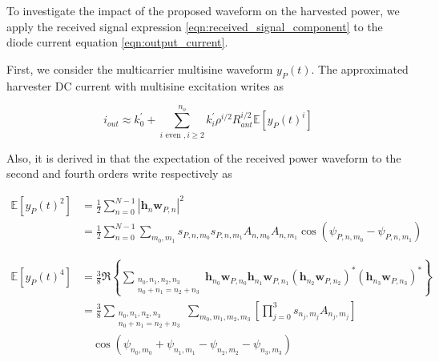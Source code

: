 To investigate the impact of the proposed waveform on the harvested power, we apply the received signal expression \ref{eqn:received_signal_component} to the diode current equation \ref{eqn:output_current}.

First, we consider the multicarrier multisine waveform ${y_P}(t)$. The approximated harvester DC current with multisine excitation writes as

\begin{equation}\label{eqn:current_power}
  {i_{out}} \approx k_0^\prime  + \sum\limits_{i{\text{ even }},i \geqslant 2}^{{n_o}} {k_i^\prime } {\rho ^{i/2}}R_{ant}^{i/2}\mathbb{E}\left[ {{y_P}{{(t)}^i}} \right]
\end{equation}

Also, it is derived in \cite{Clerckx2016} that the expectation of the received power waveform to the second and fourth orders write respectively as

\begin{align}\label{eqn:power_waveform_second_order}
  \mathbb{E}\left[ {{y_P}{{(t)}^2}} \right] &= \frac{1}{2}\sum\limits_{n = 0}^{N - 1} {{{\left| {{{\mathbf{h}}_n}{{\mathbf{w}}_{P,n}}} \right|}^2}}  \\
   &= \frac{1}{2}\sum\limits_{n = 0}^{N - 1} {\sum\limits_{{m_0},{m_1}} {{s_{P,n,{m_0}}}{s_{P,n,{m_1}}}{A_{n,{m_0}}}{A_{n,{m_1}}}\cos \left( {{\psi _{P,n,{m_0}}} - {\psi _{P,n,{m_1}}}} \right)} }
\end{align}

\begin{align}\label{eqn:power_waveform_fourth_order}
  \mathbb{E}\left[ {{y_P}{{(t)}^4}} \right] &= \frac{3}{8}\Re \left\{ {\sum\limits_{\substack{{n_0},{n_1},{n_2},{n_3} \\ {n_0} + {n_1} = {n_2} + {n_3}}} {{{\mathbf{h}}_{{n_0}}}{{\mathbf{w}}_{P,{n_0}}}{{\mathbf{h}}_{{n_1}}}{{\mathbf{w}}_{P,{n_1}}}{{\left( {{{\mathbf{h}}_{{n_2}}}{{\mathbf{w}}_{P,{n_2}}}} \right)}^*}{{\left( {{{\mathbf{h}}_{{n_3}}}{{\mathbf{w}}_{P,{n_3}}}} \right)}^*}} } \right\} \\
   &= \frac{3}{8}\sum\limits_{\substack{{n_0},{n_1},{n_2},{n_3} \\ {n_0} + {n_1} = {n_2} + {n_3}}} {\sum\limits_{{m_0},{m_1},{m_2},{m_3}} {\left[ {\prod\limits_{j = 0}^3 {{s_{{n_j},{m_j}}}} {A_{{n_j},{m_j}}}} \right] }} \nonumber \\
   &\quad \cos \left( {{\psi _{{n_0},{m_0}}} + {\psi _{{n_1},{m_1}}} - {\psi _{{n_2},{m_2}}} - {\psi _{{n_3},{m_3}}}} \right)
\end{align}

